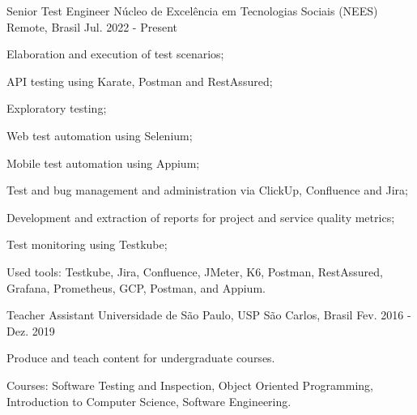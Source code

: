 

\begin{cventries}

  \cventry
    {Senior Test Engineer} %
    {Núcleo de Excelência em Tecnologias Sociais (NEES)} %
    {Remote, Brasil} %
    {Jul. 2022 - Present} %
    {
      \begin{cvitems} %
        \item Elaboration and execution of test scenarios;
        \item API testing using Karate, Postman and RestAssured;
        \item Exploratory testing;
        \item Web test automation using Selenium;
        \item Mobile test automation using Appium;
        \item Test and bug management and administration via ClickUp, Confluence and Jira;
        \item Development and extraction of reports for project and service quality metrics;
        \item Test monitoring using Testkube;
        \item Used tools: Testkube, Jira, Confluence, JMeter, K6, Postman, RestAssured, Grafana, Prometheus, GCP, Postman, and Appium.
      \end{cvitems}
    }


  \cventry
    {Teacher Assistant} %
    {Universidade de São Paulo, USP} %
    {São Carlos, Brasil} %
    {Fev. 2016 - Dez. 2019} %
    {
      \begin{cvitems} %
        \item {Produce and teach content for undergraduate courses.}
        \item {Courses: Software Testing and Inspection, Object Oriented Programming, Introduction to Computer Science, Software Engineering.}
      \end{cvitems}
    }


\end{cventries}

